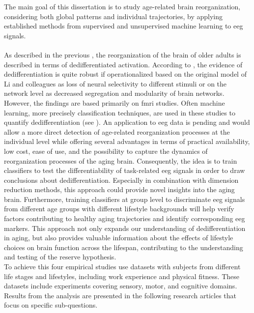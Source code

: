 The main goal of this dissertation is to study age-related brain reorganization, considering both global patterns and individual trajectories, by applying established methods from supervised and unsupervised machine learning to \gls{eeg} signals.\\
\\
As described in the previous , the reorganization of the brain of older adults is described in terms of dedifferentiated activation. According to \citeauthor{Koen2019}, the evidence of dedifferentiation is quite robust if operationalized based on the original model of Li and colleagues \cite{Li2001,Li2002} as loss of neural selectivity to different stimuli or on the network level as decreased segregation and modularity of brain networks. However, the findings are based primarily on \gls{fmri} studies. Often machine learning, more precisely classification techniques, are used in these studies to quantify dedifferentiation (see ). An application to \gls{eeg} data is pending and would allow a more direct detection of age-related reorganization processes at the individual level while offering several advantages in terms of practical availability, low cost, ease of use, and the possibility to capture the dynamics of reorganization processes of the aging brain. Consequently, the idea is to train classifiers to test the differentiability of task-related \gls{eeg} signals in order to draw conclusions about dedifferentiation. Especially in combination with dimension reduction methods, this approach could provide novel insights into the aging brain. Furthermore, training classifiers at group level to discriminate \gls{eeg} signals from different age groups with different lifestyle backgrounds will help verify factors contributing to healthy aging trajectories and identify corresponding \gls{eeg} markers. This approach not only expands our understanding of dedifferentiation in aging, but also provides valuable information about the effects of lifestyle choices on brain function across the lifespan, contributing to the understanding and testing of the reserve hypothesis.\\
To achieve this four empirical studies use datasets with subjects from different life stages and lifestyles, including work experience and physical fitness. These datasets include experiments covering sensory, motor, and cognitive domains. Results from the analysis are presented in the following research articles that focus on specific sub-questions.\\
